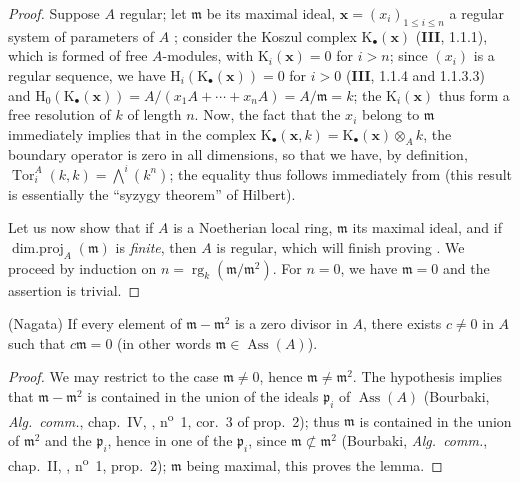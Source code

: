 \begin{proof}
Suppose $A$ regular;
let $\mathfrak{m}$ be its maximal ideal, $\mathbf{x}=(x_i)_{1\leq i\leq n}$ a regular system of parameters of $A$ ;
consider the Koszul complex $\mathrm{K}_\bullet(\mathbf{x})$ (\textbf{III}, 1.1.1), which is formed of free $A$-modules, with $\mathrm{K}_i(\mathbf{x})=0$ for $i>n$;
since $(x_i)$ is a regular sequence, we have $\mathrm{H}_i(\mathrm{K}_\bullet(\mathbf{x}))=0$ for $i>0$ (\textbf{III}, 1.1.4 and 1.1.3.3) and $\mathrm{H}_0(\mathrm{K}_\bullet(\mathbf{x}))=A/(x_1 A+\cdots+x_n A)=A/\mathfrak{m}=k$;
the $\mathrm{K}_i(\mathbf{x})$ thus form a free resolution of $k$ of length $n$.
Now, the fact that the $x_i$ belong to $\mathfrak{m}$ immediately implies that in the complex $\mathrm{K}_\bullet(\mathbf{x},k)=\mathrm{K}_\bullet(\mathbf{x})\otimes_A k$, the boundary operator is zero in all dimensions, so that we have, by definition, $\operatorname{Tor}^A_i(k,k)=\textstyle\bigwedge^i(k^n)$;
the equality  thus follows immediately from  (this result is essentially the ``syzygy theorem'' of Hilbert).

Let us now show that if $A$ is a Noetherian local ring, $\mathfrak{m}$ its maximal ideal, and if $\operatorname{dim.proj}_A(\mathfrak{m})$ is \emph{finite}, then $A$ is regular, which will finish proving .
We proceed by induction on $n=\operatorname{rg}_k(\mathfrak{m}/\mathfrak{m}^2)$.
For $n=0$, we have $\mathfrak{m}=0$ and the assertion is trivial.
\end{proof}

\begin{lemma}[17.3.1.2]
\label{0.17.3.1.2}
\textnormal{(Nagata)}
If every element of $\mathfrak{m}-\mathfrak{m}^2$ is a zero divisor in $A$, there exists $c\neq 0$ in $A$ such that $c\mathfrak{m}=0$ (in other words $\mathfrak{m}\in\operatorname{Ass}(A)$).
\end{lemma}

\begin{proof}
We may restrict to the case $\mathfrak{m}\neq 0$, hence $\mathfrak{m}\neq\mathfrak{m}^2$.
The hypothesis implies that $\mathfrak{m}-\mathfrak{m}^2$ is contained in the union of the ideals $\mathfrak{p}_i$ of $\operatorname{Ass}(A)$ (Bourbaki, \emph{Alg.~comm.}, chap.~IV, , n\textsuperscript{o}~1, cor.~3 of prop.~2);
thus $\mathfrak{m}$ is contained in the union of $\mathfrak{m}^2$ and the $\mathfrak{p}_i$, hence in one of the $\mathfrak{p}_i$, since $\mathfrak{m}\not\subset\mathfrak{m}^2$ (Bourbaki, \emph{Alg.~comm.}, chap.~II, , n\textsuperscript{o}~1, prop.~2);
$\mathfrak{m}$ being maximal, this proves the lemma.
\end{proof}

